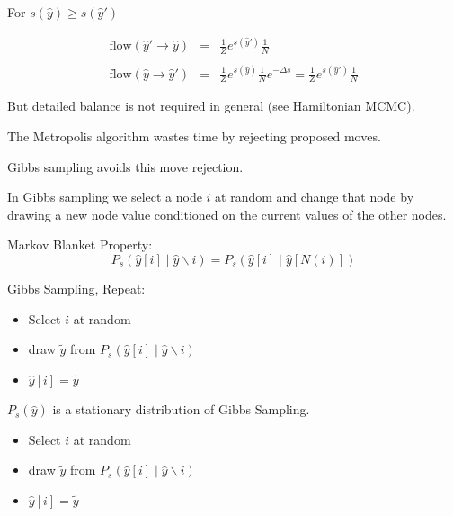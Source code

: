 {

For $s(\hat{y}) \geq s(\hat{y}')$

\vfill
\begin{eqnarray*}
  \mathrm{flow}(\hat{y}' \rightarrow \hat{y}) &  = & \frac{1}{Z}e^{s(\hat{y}')} \frac{1}{N} \\
  \\
\mathrm{flow}(\hat{y} \rightarrow \hat{y}') & = & \frac{1}{Z}e^{s(\hat{y})} \frac{1}{N} e^{-\Delta s} = \frac{1}{Z} e^{s(\hat{y}')} \frac{1}{N}
\end{eqnarray*}

\vfill
But detailed balance is not required in general (see Hamiltonian MCMC).


The Metropolis algorithm wastes time by rejecting proposed moves.

\vfill
Gibbs sampling avoids this move rejection.

\vfill
In Gibbs sampling we select a node $i$ at random and change that node by drawing a new node value conditioned on the current values of the other nodes.


Markov Blanket Property:
$$P_s(\hat{y}[i] \;|\;\hat{y} \backslash i) = P_s(\hat{y}[i] \;|\; \hat{y}[N(i)])$$
  
\vfill
Gibbs Sampling, Repeat:

\begin{itemize}
\item   Select $i$ at random

\item draw $\tilde{y}$ from $P_s(\hat{y}[i] \;|\;\hat{y} \backslash i)$

\item $\hat{y}[i] = \tilde{y}$
\end{itemize}


$P_s(\hat{y})$ is a stationary distribution of Gibbs Sampling.

\vfill
\begin{itemize}
\item   Select $i$ at random

\item draw $\tilde{y}$ from $P_s(\hat{y}[i] \;|\;\hat{y} \backslash i)$

\item $\hat{y}[i] = \tilde{y}$
\end{itemize}


}
